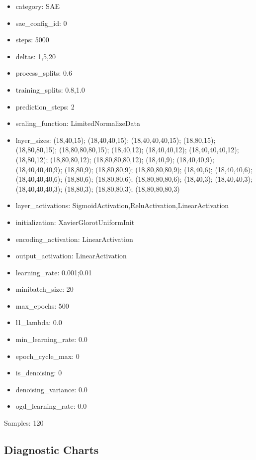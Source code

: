 \documentclass[a4paper,11pt,oneside]{article}
\theoremstyle{plain}
\theoremstyle{definition}
\begin{document}
\begin{itemize}
	\item category: SAE
	\item sae\_config\_id: 0
	\item steps: 5000
	\item deltas: 1,5,20
	\item process\_splits: 0.6
	\item training\_splits: 0.8,1.0
	\item prediction\_steps: 2
	\item scaling\_function: LimitedNormalizeData
	\item layer\_sizes: (18,40,15); (18,40,40,15); (18,40,40,40,15); (18,80,15); (18,80,80,15); (18,80,80,80,15); (18,40,12); (18,40,40,12); (18,40,40,40,12); (18,80,12); (18,80,80,12); (18,80,80,80,12); (18,40,9); (18,40,40,9); (18,40,40,40,9); (18,80,9); (18,80,80,9); (18,80,80,80,9); (18,40,6); (18,40,40,6); (18,40,40,40,6); (18,80,6); (18,80,80,6); (18,80,80,80,6); (18,40,3); (18,40,40,3); (18,40,40,40,3); (18,80,3); (18,80,80,3); (18,80,80,80,3)
	\item layer\_activations: SigmoidActivation,ReluActivation,LinearActivation
	\item initialization: XavierGlorotUniformInit
	\item encoding\_activation: LinearActivation
	\item output\_activation: LinearActivation
	\item learning\_rate: 0.001;0.01
	\item minibatch\_size: 20
	\item max\_epochs: 500
	\item l1\_lambda: 0.0
	\item min\_learning\_rate: 0.0
	\item epoch\_cycle\_max: 0
	\item is\_denoising: 0
	\item denoising\_variance: 0.0
	\item ogd\_learning\_rate: 0.0
\end{itemize}

Samples: 120

\newpage
\subsection{Diagnostic Charts}\label{appendix_diagnostics}
\end{document}
